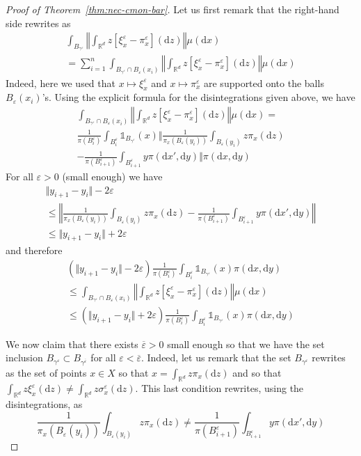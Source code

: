 \documentclass[leqno, 11pt, a4paper]{amsart}
\theoremstyle{definition}
\newcommand{\R}{\mathbb{R}}
\newcommand{\eps}{\varepsilon}
\newcommand{\dd}{\mathrm{d}}
\begin{document}
\begin{proof}[Proof of Theorem~\ref{thm:nec-cmon-bar}]
     Let us first remark that the right-hand side rewrites as 
	 \begin{multline}
	     \int_{B_{\gamma^\eps}} \left\Vert \int_{\R^d} z [\xi^\eps_x - \pi^\eps_x](\dd z) \right\Vert \mu(\dd x) \\ = \sum_{i = 1}^n 	\int_{B_{\gamma^\eps} \cap B_\eps(x_i)} \left\Vert \int_{\R^d} z [\xi^\eps_x - \pi^\eps_x](\dd z) \right\Vert \mu(\dd x)
	 \end{multline}
    Indeed, here we used that $x \mapsto \xi_x^\eps$ and $x \mapsto \pi_x^\eps$ are supported onto the balls $B_\eps(x_i)$'s. Using the explicit formula for the disintegrations given above, we have 
     \begin{multline}
             \int_{B_{\gamma^\eps} \cap B_\eps(x_i)} \left\Vert \int_{\R^d} z [\xi^\eps_x - \pi^\eps_x](\dd z) \right\Vert \mu(\dd x) =\\
             \frac{1}{\pi(B_i^\eps)} \int_{B_i^\eps} \mathds{1}_{B_{\gamma^\eps}}(x) \Bigg\Vert \frac{1}{\pi_x(B_\eps(y_i))}\int_{B_\eps(y_i)}z \pi_x(\dd z) \\- \frac1{\pi(B_{i+1}^\eps)} \int_{B_{i+1}^\eps} y\pi(\dd x', \dd y)\Bigg \Vert \pi(\dd x, \dd y)
     \end{multline}
     For all $\eps > 0$ (small enough) we have 
     \begin{multline}
     \Vert y_{i+1} - y_i \Vert - 2\eps \\\leq \left\Vert \frac{1}{\pi_x(B_\eps(y_i))}\int_{B_\eps(y_i)}z \pi_x(\dd z) - \frac1{\pi(B_{i+1}^\eps)} \int_{B_{i+1}^\eps} y\pi(\dd x', \dd y)\right \Vert \\\leq \Vert y_{i+1} - y_i \Vert + 2\eps
     \end{multline}
     and therefore 
     \begin{multline}
         (\Vert y_{i+1} - y_i \Vert - 2\eps)\frac{1}{\pi(B_i^\eps)} \int_{B_i^\eps} \mathds{1}_{B_{\gamma^\eps}}(x) \pi(\dd x, \dd y)  \\
         \leq
         \int_{B_{\gamma^\eps} \cap B_\eps(x_i)} \left\Vert \int_{\R^d} z [\xi^\eps_x - \pi^\eps_x](\dd z) \right\Vert \mu(\dd x) \\
         \leq (\Vert y_{i+1} - y_i \Vert + 2\eps)\frac{1}{\pi(B_i^\eps)} \int_{B_i^\eps} \mathds{1}_{B_{\gamma^\eps}}(x) \pi(\dd x, \dd y)
     \end{multline}


We now claim that there exists $\overline{\eps} > 0$ small enough so that we have the set inclusion $B_{\gamma^\eps} \subset B_{\gamma^{\overline{\eps}}}$ for all $\eps < \overline{\eps}$. Indeed, let us remark that the set $B_{\gamma^\eps}$ rewrites as the set of points $x \in X$ so that $x = \int_{\R^d} z \pi_x(\dd z)$ and so that $\int_{\R^d} z \xi^\eps_x(\dd z) \neq \int_{\R^d} z \sigma^\eps_x(\dd z)$. This last condition rewrites, using the disintegrations, as 
\begin{equation}\label{eq:b_gamma_eps_}
    \frac{1}{\pi_x(B_\eps(y_i))} \int_{B_\eps(y_i)} z \pi_x(\dd z) \neq \frac{1}{\pi(B_{i+1}^\eps)} \int_{B_{i+1}^\eps} y \pi(\dd x', \dd y)
\end{equation}


\end{proof}
\end{document}
